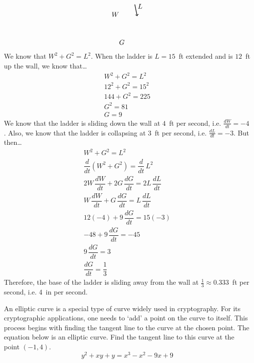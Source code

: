 \documentclass[12pt,letterpaper]{exam}
\begin{document}
\begin{questions}
{\[\begin{tikzpicture}[scale=0.6]
	\draw[line width=0.03cm,->] (2.75,3.25) -- (2.95,2.25);
	\node at (1.65,0) {$G$};
	\node at (1.1,2.4) {$W$};
	\node at (3.2,3.1) {$L$};
	\end{tikzpicture}
	\]
We know that $W^ 2+ G^2= L^2$. When the ladder is $L= 15$~ft extended and is $12$~ft up the wall, we know that\dots
	\[
	\begin{gathered}
	W^2 + G^2= L^2 \\
	12^2 + G^2= 15^2 \\
	144 + G^2= 225 \\
	G^2= 81 \\
	G= 9
	\end{gathered}
	\]
We know that the ladder is sliding down the wall at $4$~ft per second, i.e. $\frac{dW}{dt}= -4$. Also, we know that the ladder is collapsing at $3$~ft per second, i.e. $\frac{dL}{dt}= - 3$. But then\dots
	\[
	\begin{gathered}
	W^ 2+ G^2= L^2 \\
	\dfrac{d}{dt} \left( W^ 2+ G^2 \right)= \dfrac{d}{dt} \, L^2 \\
	2W\, \dfrac{dW}{dt} + 2G\, \dfrac{dG}{dt}= 2L\, \dfrac{dL}{dt} \\
	W\, \dfrac{dW}{dt} + G\, \dfrac{dG}{dt}= L\, \dfrac{dL}{dt} \\
	12(-4) + 9 \, \dfrac{dG}{dt}= 15 (-3) \\
	-48 + 9 \, \dfrac{dG}{dt}= -45 \\
	9 \, \dfrac{dG}{dt}= 3 \\
	\dfrac{dG}{dt}= \dfrac{1}{3}
	\end{gathered}
	\]
Therefore, the base of the ladder is sliding away from the wall at $\frac{1}{3} \approx 0.333$~ft per second, i.e. 4~in per second.
}



\newpage
\question[16] An elliptic curve is a special type of curve widely used in cryptography. For its cryptographic applications, one needs to `add' a point on the curve to itself. This process begins with finding the tangent line to the curve at the chosen point. The equation below is an elliptic curve. Find the tangent line to this curve at the point $(-1, 4)$.
	\[
	y^2 + xy + y= x^3 - x^2 - 9x + 9
	\] \pspace


\end{questions}
\end{document}
